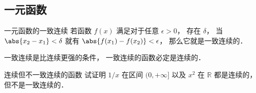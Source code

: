 

\subsection{一元函数}
\begin{definition}{一元函数的一致连续}
若函数 $f(x)$ 满足对于任意 $\epsilon > 0$， 存在 $\delta$， 当 $\abs{x_2 - x_1} < \delta$ 就有 $\abs{f(x_1) - f(x_2)} < \epsilon$， 那么它就是一致连续的．
\end{definition}

一致连续是比连续更强的条件， 一致连续的函数必定是连续的．

\begin{exercise}{连续但不一致连续的函数}
试证明 $1/x$ 在区间 $(0, +\infty]$ 以及 $x^2$ 在 $\mathbb R$ 都是连续的， 但不是一致连续的．
\end{exercise}
